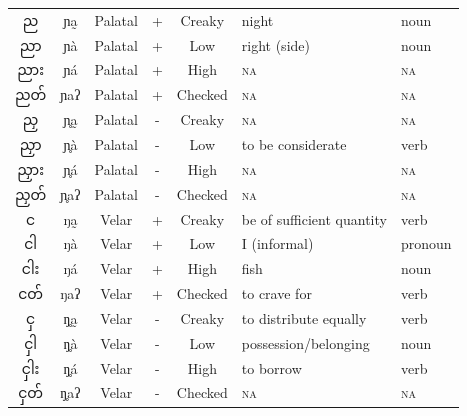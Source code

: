 \documentclass[12pt]{article}
\newcommand{\burm}[1]{{\fontspec[Script=Myanmar]{Padauk}#1}}
\newcommand{\ipa}[1]{{\fontspec{Times New Roman}#1}}
\begin{document}
\begin{table}[h!]
\begin{tabular}{cccccll}
	\burm{ည   }    & \ipa{ɲa̰}  & Palatal  & +     & Creaky  & night                     & noun     \\
	\burm{ညာ  }    & \ipa{ɲà}  & Palatal  & +     & Low     & right (side)              & noun     \\
	\burm{ညား }    & \ipa{ɲá}  & Palatal  & +     & High    & \textsc{na}                        & \textsc{na}       \\
	\burm{ညတ် }    & \ipa{ɲaʔ}  & Palatal  & +     & Checked & \textsc{na}                        & \textsc{na}       \\
	\burm{ညှ  }    & \ipa{ɲ̥a̰} & Palatal  & -     & Creaky  & \textsc{na}                        & \textsc{na}       \\
	\burm{ညှာ }    & \ipa{ɲ̥à} & Palatal  & -     & Low     & to be considerate         & verb     \\
	\burm{ညှား}    & \ipa{ɲ̥á} & Palatal  & -     & High    & \textsc{na}                        & \textsc{na}       \\
	\burm{ညှတ်}    & \ipa{ɲ̥aʔ} & Palatal  & -     & Checked & \textsc{na}                        & \textsc{na}       \\
	\burm{င   }    & \ipa{ŋa̰}  & Velar    & +     & Creaky  & be of sufficient quantity & verb     \\
	\burm{ငါ  }    & \ipa{ŋà}  & Velar    & +     & Low     & I (informal)              & pronoun  \\
	\burm{ငါး }    & \ipa{ŋá}  & Velar    & +     & High    & fish                      & noun     \\
	\burm{ငတ် }    & \ipa{ŋaʔ}  & Velar    & +     & Checked & to crave for              & verb     \\
	\burm{ငှ  }    & \ipa{ŋ̥a̰} & Velar    & -     & Creaky  & to distribute equally     & verb     \\
	\burm{ငှါ }    & \ipa{ŋ̥à} & Velar    & -     & Low     & possession/belonging      & noun     \\
	\burm{ငှါး}    & \ipa{ŋ̥á} & Velar    & -     & High    & to borrow                 & verb     \\
	\burm{ငှတ်}    & \ipa{ŋ̥aʔ} & Velar    & -     & Checked & \textsc{na}                        & \textsc{na}    \\
	\bottomrule  
	\end{tabular}
\end{table}
\end{document}
